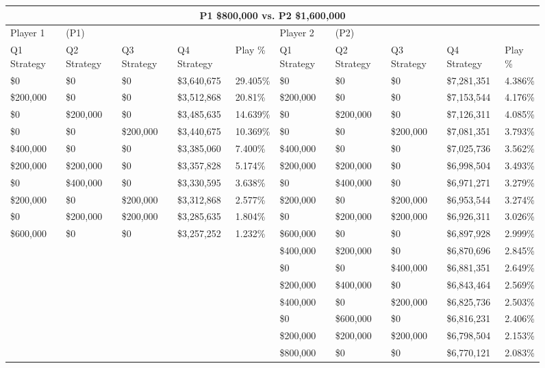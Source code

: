\documentclass[11pt]{article}
\begin{document}
\begin{figure}
\tiny
\begin{tabular}{ |p{1.0cm}p{1.0cm}p{1.0cm}p{2.0cm}|p{1.0cm}||p{1.0cm}p{1.0cm}p{1.0cm}p{2.0cm}|p{1.0cm}|}
\hline
\multicolumn{10}{|c|}{P1 \$800,000 vs. P2 \$1,600,000} \\
\hline
Player 1 & (P1) & & & & Player 2 & (P2) & & & \\
\hline
Q1 Strategy & Q2 Strategy & Q3 Strategy & Q4 Strategy  &  Play \% & Q1 Strategy & Q2 Strategy & Q3 Strategy & Q4 Strategy  &  Play \%\\
\hline
\$0 & \$0 & \$0 & \$3,640,675 & 29.405\% & \$0 & \$0 & \$0 & \$7,281,351 & 4.386\% \\
\$200,000 & \$0 & \$0 & \$3,512,868 & 20.81\% & \$200,000 & \$0 & \$0 & \$7,153,544 & 4.176\% \\
\$0 & \$200,000 & \$0 & \$3,485,635 & 14.639\% & \$0 & \$200,000 & \$0 & \$7,126,311 & 4.085\% \\
\$0 & \$0 & \$200,000 & \$3,440,675 & 10.369\% & \$0 & \$0 & \$200,000 & \$7,081,351 & 3.793\% \\
\$400,000 & \$0 & \$0 & \$3,385,060 & 7.400\% & \$400,000 & \$0 & \$0 & \$7,025,736 & 3.562\% \\
\$200,000 & \$200,000 & \$0 & \$3,357,828 & 5.174\% & \$200,000 & \$200,000 & \$0 & \$6,998,504 & 3.493\% \\
\$0 & \$400,000 & \$0 & \$3,330,595 & 3.638\% & \$0 & \$400,000 & \$0 & \$6,971,271 & 3.279\% \\
\$200,000 & \$0 & \$200,000 & \$3,312,868 & 2.577\% & \$200,000 & \$0 & \$200,000 & \$6,953,544 & 3.274\% \\
\$0 & \$200,000 & \$200,000 & \$3,285,635 & 1.804\% & \$0 & \$200,000 & \$200,000 & \$6,926,311 & 3.026\% \\
\$600,000 & \$0 & \$0 & \$3,257,252 & 1.232\% & \$600,000 & \$0 & \$0 & \$6,897,928 & 2.999\% \\
&&&&&\$400,000 & \$200,000 & \$0 & \$6,870,696 & 2.845\% \\
&&&&&\$0 & \$0 & \$400,000 & \$6,881,351 & 2.649\% \\
&&&&&\$200,000 & \$400,000 & \$0 & \$6,843,464 & 2.569\% \\
&&&&&\$400,000 & \$0 & \$200,000 & \$6,825,736 & 2.503\% \\
&&&&&\$0 & \$600,000 & \$0 & \$6,816,231 & 2.406\% \\
&&&&&\$200,000 & \$200,000 & \$200,000 & \$6,798,504 & 2.153\% \\
&&&&&\$800,000 & \$0 & \$0 & \$6,770,121 & 2.083\% \\

\end{tabular}
\end{figure}
\end{document}
